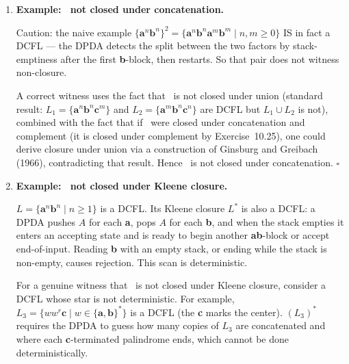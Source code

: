 \begin{enumerate}[{10.}1. ]
Construct $P'$ by swapping final and nonfinal states of $P$: a string is accepted by $P'$ iff it is rejected by $P$. The main issue (mentioned in the hint) is $\lambda$-moves cycling through both final and nonfinal states: since Exercise 10.24 ensures the DPDA is well-behaved (complete, non-emptying, full-input scanning), after processing any input string, the computation ends deterministically in exactly one state. Swapping final/nonfinal gives the complement. \qed

\item \textbf{Example: \ASIG\ not closed under concatenation.}

Caution: the naive example $\{\pmb{a}^n\pmb{b}^n\}^2 = \{\pmb{a}^n\pmb{b}^n\pmb{a}^m\pmb{b}^m \mid n,m\geq 0\}$ IS in fact a DCFL — the DPDA detects the split between the two factors by stack-emptiness after the first \textbf{b}-block, then restarts. So that pair does not witness non-closure.

A correct witness uses the fact that \ASIG\ is not closed under union (standard result: $L_1=\{\pmb{a}^n\pmb{b}^n\pmb{c}^m\}$ and $L_2=\{\pmb{a}^m\pmb{b}^n\pmb{c}^n\}$ are DCFL but $L_1\cup L_2$ is not), combined with the fact that if \ASIG\ were closed under concatenation and complement (it is closed under complement by Exercise~10.25), one could derive closure under union via a construction of Ginsburg and Greibach (1966), contradicting that result. Hence \ASIG\ is not closed under concatenation. $\square$

\item \textbf{Example: \ASIG\ not closed under Kleene closure.}

$L = \{\pmb{a}^n\pmb{b}^n \mid n\geq 1\}$ is a DCFL. Its Kleene closure $L^*$ is also a DCFL: a DPDA pushes $A$ for each \textbf{a}, pops $A$ for each \textbf{b}, and when the stack empties it enters an accepting state and is ready to begin another \textbf{a}\textbf{b}-block or accept end-of-input. Reading \textbf{b} with an empty stack, or ending while the stack is non-empty, causes rejection. This scan is deterministic.

For a genuine witness that \ASIG\ is not closed under Kleene closure, consider a DCFL whose star is not deterministic. For example, $L_3=\{ww^r\pmb{c} \mid w\in\{\pmb{a},\pmb{b}\}^*\}$ is a DCFL (the \textbf{c} marks the center). $(L_3)^*$ requires the DPDA to guess how many copies of $L_3$ are concatenated and where each \textbf{c}-terminated palindrome ends, which cannot be done deterministically.


\end{enumerate}
